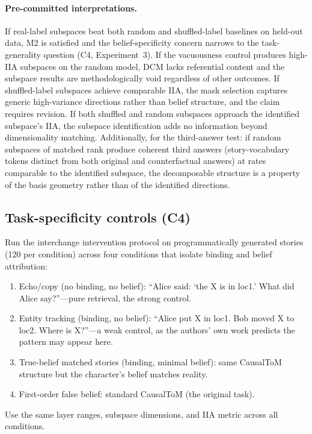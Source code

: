 \documentclass{article}
\begin{document}
\paragraph{Pre-committed interpretations.} If real-label subspaces beat both random and shuffled-label baselines on held-out data, M2 is satisfied and the belief-specificity concern narrows to the task-generality question (C4, Experiment~3). If the vacuousness control produces high-IIA subspaces on the random model, DCM lacks referential content and the subspace results are methodologically void regardless of other outcomes. If shuffled-label subspaces achieve comparable IIA, the mask selection captures generic high-variance directions rather than belief structure, and the claim requires revision. If both shuffled and random subspaces approach the identified subspace's IIA, the subspace identification adds no information beyond dimensionality matching. Additionally, for the third-answer test: if random subspaces of matched rank produce coherent third answers (story-vocabulary tokens distinct from both original and counterfactual answers) at rates comparable to the identified subspace, the decomposable structure is a property of the basis geometry rather than of the identified directions.

\subsection{Task-specificity controls (C4)}

Run the interchange intervention protocol on programmatically generated stories (120 per condition) across four conditions that isolate binding and belief attribution:

\begin{enumerate}
\item Echo/copy (no binding, no belief): ``Alice said: `the X is in loc1.' What did Alice say?''---pure retrieval, the strong control.
\item Entity tracking (binding, no belief): ``Alice put X in loc1. Bob moved X to loc2. Where is X?''---a weak control, as the authors' own work predicts the pattern may appear here.
\item True-belief matched stories (binding, minimal belief): same CausalToM structure but the character's belief matches reality.
\item First-order false belief: standard CausalToM (the original task).
\end{enumerate}

Use the same layer ranges, subspace dimensions, and IIA metric across all conditions.
\end{document}
